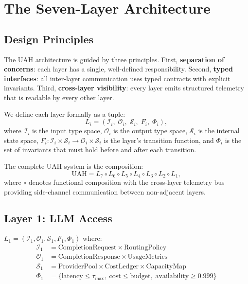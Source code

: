\section{The Seven-Layer Architecture}

\label{sec:architecture}

\subsection{Design Principles}

The UAH architecture is guided by three principles. First, \textbf{separation
of concerns}: each layer has a single, well-defined responsibility. Second,
\textbf{typed interfaces}: all inter-layer communication uses typed contracts
with explicit invariants. Third, \textbf{cross-layer visibility}: every layer
emits structured telemetry that is readable by every other layer.

We define each layer formally as a tuple:
\begin{equation}
    L_i = \left(\mathcal{I}_i,\; \mathcal{O}_i,\; \mathcal{S}_i,\;
                 F_i,\; \Phi_i\right),
\end{equation}
where $\mathcal{I}_i$ is the input type space, $\mathcal{O}_i$ is the output
type space, $\mathcal{S}_i$ is the internal state space, $F_i :
\mathcal{I}_i \times \mathcal{S}_i \to \mathcal{O}_i \times \mathcal{S}_i$ is
the layer's transition function, and $\Phi_i$ is the set of invariants that
must hold before and after each transition.

The complete UAH system is the composition:
\begin{equation}
    \text{UAH} = L_7 \circ L_6 \circ L_5 \circ L_4 \circ L_3 \circ L_2 \circ L_1,
\end{equation}
where $\circ$ denotes functional composition with the cross-layer telemetry
bus providing side-channel communication between non-adjacent layers.

\subsection{Layer 1: LLM Access}

\begin{definition}
    $L_1 = \left(\mathcal{I}_1, \mathcal{O}_1, \mathcal{S}_1, F_1, \Phi_1\right)$ where:
    \begin{align*}
        \mathcal{I}_1 &= \text{CompletionRequest} \times \text{RoutingPolicy} \\
        \mathcal{O}_1 &= \text{CompletionResponse} \times \text{UsageMetrics} \\
        \mathcal{S}_1 &= \text{ProviderPool} \times \text{CostLedger} \times \text{CapacityMap} \\
        \Phi_1 &= \{\text{latency} \leq \tau_{\max},\; \text{cost} \leq \text{budget},\;
                    \text{availability} \geq 0.999\}
    \end{align*}
\end{definition}

